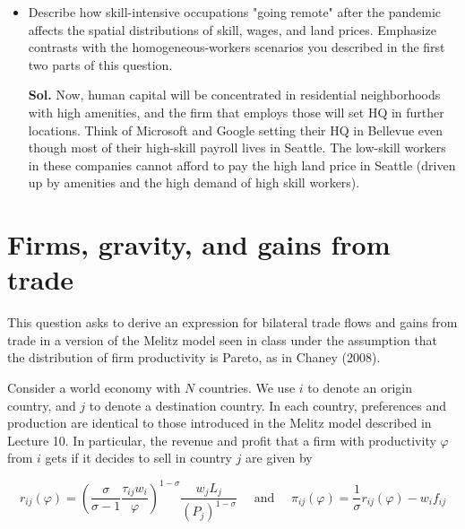 \documentclass[12pt,oneside,reqno]{amsart}
\begin{document}
\begin{enumerate}[label=\textbf{\roman*.}]
\begin{itemize}
    \item Describe how skill-intensive occupations "going remote" after the pandemic affects the spatial distributions of skill, wages, and land prices. Emphasize contrasts with the homogeneous-workers scenarios you described in the first two parts of this question. 
    \item[\textbf{Sol.}] Now, human capital will be concentrated in residential neighborhoods with high amenities, and the firm that employs those will set HQ in further locations. Think of Microsoft and Google setting their HQ in Bellevue even though most of their high-skill payroll lives in Seattle. The low-skill workers in these companies cannot afford to pay the high land price in Seattle (driven up by amenities and the high demand of high skill workers). 
\end{itemize}

\end{enumerate}
\clearpage
\section{Firms, gravity, and gains from trade}

This question asks to derive an expression for bilateral trade flows and gains from trade in a version of the Melitz model seen in class under the assumption that the distribution of firm productivity is Pareto, as in Chaney (2008).

Consider a world economy with $N$ countries. We use $i$ to denote an origin country, and $j$ to denote a destination country. In each country, preferences and production are identical to those introduced in the Melitz model described in Lecture 10. In particular, the revenue and profit that a firm with productivity $\varphi$ from $i$ gets if it decides to sell in country $j$ are given by

\begin{equation*}
r_{i j}(\varphi)=\left(\frac{\sigma}{\sigma-1} \frac{\tau_{i j} w_{i}}{\varphi}\right)^{1-\sigma} \frac{w_{j} L_{j}}{\left(P_{j}\right)^{1-\sigma}} \quad \text { and } \quad \pi_{i j}(\varphi)=\frac{1}{\sigma} r_{i j}(\varphi)-w_{i} f_{i j}
\end{equation*}
\end{document}
